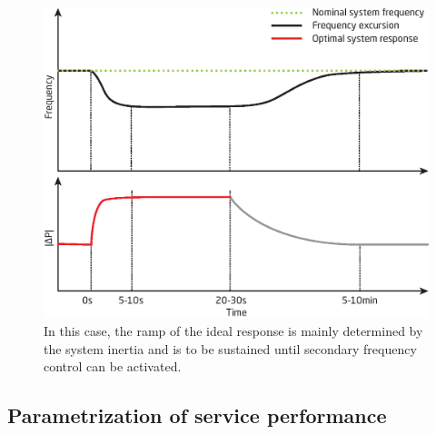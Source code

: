 \begin{figure}[htbp!]
\centering
\includegraphics[width=1\columnwidth]{graphics/ddras/primary_frequency_control_ideal.eps}
\caption{In this case, the ramp of the ideal response is mainly determined by the system inertia and is to be sustained until secondary frequency control can be activated.}
\label{fig:ddrasidealresponse}
\end{figure}

\subsection{Parametrization of service performance}\label{subsec:parametrization}

